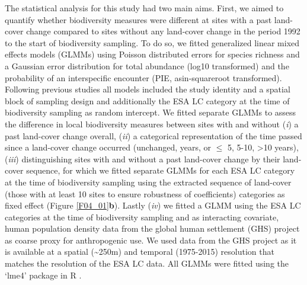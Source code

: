 The statistical analysis for this study had two main aims. First, we aimed to quantify whether biodiversity measures were different at sites with a past land-cover change compared to sites without any land-cover change in the period 1992 to the start of biodiversity sampling. To do so, we fitted generalized linear mixed effects models (GLMMs) using Poisson distributed errors for species richness and a Gaussian error distribution for total abundance (log10 transformed) and the probability of an interspecific encounter (PIE, asin-squareroot transformed). Following previous studies \citep{Newbold2015,Jung2016} all models included the study identity and a spatial block of sampling design and additionally the ESA LC category at the time of biodiversity sampling as random intercept. We fitted separate GLMMs to assess the difference in local biodiversity measures between sites with and without (\textit{i}) a past land-cover change overall, (\textit{ii}) a categorical representation of the time passed since a land-cover change occurred (unchanged,  years, or $\leq$ 5, 5-10, >10 years), (\textit{iii}) distinguishing sites with and without a past land-cover change by their land-cover sequence, for which we fitted separate GLMMs for each ESA LC category at the time of biodiversity sampling using the extracted sequence of land-cover (those with at least 10 sites to ensure robustness of coefficients) categories as fixed effect (Figure \ref{F04_01}\textbf{b}). Lastly (\textit{iv}) we fitted a GLMM using the ESA LC categories at the time of biodiversity sampling and as interacting covariate, human population density data from the global human settlement (GHS) project \citep{Pesaresi2013,Pesaresi2016} as coarse proxy for anthropogenic use. We used data from the GHS project as it is available at a spatial (\textasciitilde 250m) and temporal (1975-2015) resolution that matches the resolution of the ESA LC data. All GLMMs were fitted using the ‘lme4’ package \citep[ver. 1.1-18-1,][]{lme4} in R \citep[ver. 3.5, ][]{RTeam2014}.

